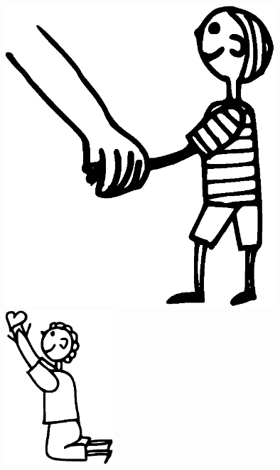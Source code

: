 \documentclass[11pt,a4paper,twoside]{article}
\begin{document}
\vfil
\pagebreak
\vfil
\includegraphics[width=10cm]{5.eps}
\pagebreak
\hspace*{6cm}\includegraphics[width=4cm]{6.eps}
\vfil
\pagebreak
\vfil
\end{document}
